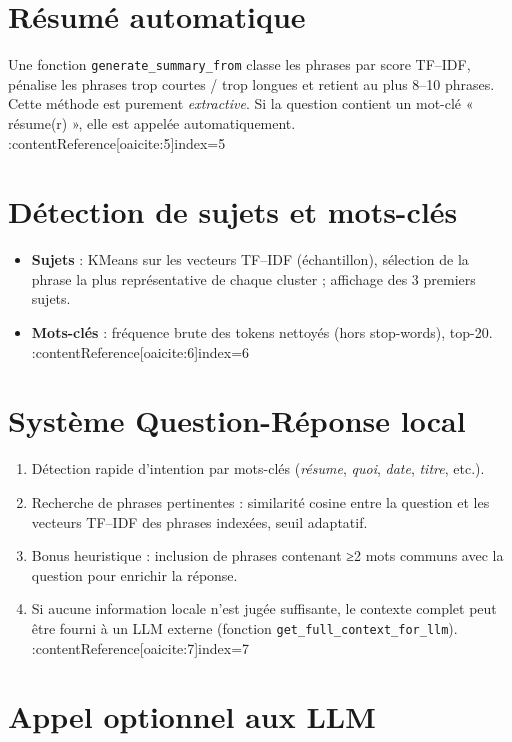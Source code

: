 \documentclass[12pt,a4paper]{report}
\begin{document}
\section{Résumé automatique}

Une fonction \verb|generate_summary_from| classe les phrases par score TF–IDF, pénalise les phrases trop courtes / trop longues et retient au plus 8–10 phrases.  
Cette méthode est purement \emph{extractive}.  
Si la question contient un mot-clé « résume(r) », elle est appelée automatiquement. :contentReference[oaicite:5]{index=5}

\section{Détection de sujets et mots-clés}

\begin{itemize}
  \item \textbf{Sujets} : KMeans sur les vecteurs TF–IDF (échantillon), sélection de la phrase la plus représentative de chaque cluster ; affichage des 3 premiers sujets.  
  \item \textbf{Mots-clés} : fréquence brute des tokens nettoyés (hors stop-words), top-20. :contentReference[oaicite:6]{index=6}
\end{itemize}

\section{Système Question-Réponse local}

\begin{enumerate}
  \item Détection rapide d’intention par mots-clés (\textit{résume}, \textit{quoi}, \textit{date}, \textit{titre}, etc.).  
  \item Recherche de phrases pertinentes : similarité cosine entre la question et les vecteurs TF–IDF des phrases indexées, seuil adaptatif.  
  \item Bonus heuristique : inclusion de phrases contenant ≥2 mots communs avec la question pour enrichir la réponse.  
  \item Si aucune information locale n’est jugée suffisante, le contexte complet peut être fourni à un LLM externe (fonction \verb|get_full_context_for_llm|). :contentReference[oaicite:7]{index=7}
\end{enumerate}

\section{Appel optionnel aux LLM}
\end{document}
